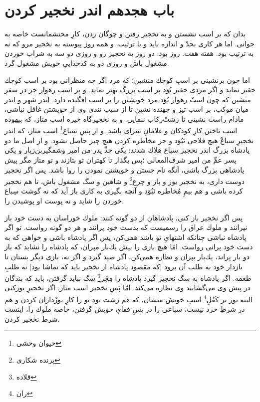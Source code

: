 \section*{باب هجدهم
اندر نخجير كردن}

بدان كه بر اسب نشستن و به نخجير رفتن و چوگان زدن، كارِ محتشمانست خاصه به جوانى. اما هر كارى بحدّ و اندازه بايد و با ترتيب. و همه روز پيوسته به نخجير مرو كه نه به ترتيب بود. هفته هفت. روز بود: دو روز به نخجير رو و روزى دو سه به شراب خوردن مشغول باش و روزى دو به كدخدايیِ خويش مشغول گرد.

اما چون برنشينى بر اسبِ كوچك منشين؛ كه مرد اگر چه منظرانى بود بر اسب كوچك حقير نمايد و اگر مردى حقير بُوَد بر اسب بزرگ بهتر نمايد. و بر اسب رهوار جز در سفر منشين كه چون اسبْ رهوار بُوَد مرد خويشتن را بر اسب افگنده دارد. اندر شهر و اندر ميان موكب، بر اسب تيز و جهنده نشين تا از سبب تندى وى از خويشتن غافل نباشى، مادام راست نشينى تا زشت‌ْركاب ننمايى. و به نخجيرگاه خيره‌ اسب متاز، كه بيهوده اسب تاختن كارِ كودكان و غلامان‌ِ سراى باشد. و از پسِ سباع\footnote{حیوان وحشی} اسب متاز، كه اندر نخجيرِ سباعْ هيچ فلاحى نَبُوَد و جز مخاطره كردن هيچ چيز حاصل نشود. و از اصل ما دو پادشاه بزرگ اندر نخجير سباع هلاك شدند: يكى جدِّ پدر من امير وشمگيربن‌زيار و يكى پسر عمِّ من امير شرف‌المعالى ؛پس بگذار تا كهتران تو بتازند و تو متاز مگر پيش پادشاهى بزرگ باشى، آنگه نام جستن و خويشتن نمودن را روا باشد. پس اگر نخجير دوست دارى، به نخجير يوز و باز و چرغ\footnote{پرنده‌ شکاری} و شاهين و سگ مشغول باش، تا هم نخجير كرده باشى و هم بيمِ مُخاطره نَبُوَد و آنچه بگيرى به كارى باز آيد كه نه گوشت سِباع خوردن را شايد و نه پوست او پوشيدن را.

پس اگر نخجير باز كنى،  پادشاهان از دو گونه كنند: ملوك خوراسان به دست خود باز نپرانند و ملوك عراق را رسميست كه بدست خود پرانند و هر دو گونه رواست. تو اگر پادشاه نباشى چنانكه اشتهاىِ تو باشد همى‌كن، پس اگر پادشاه باشى و خواهى كه به دست خود پرانى رواست. امّا هيچ بازى را بيش يك‌بار مپران، كه پادشاه را نشايد كه باز دو بار پراند، يك‌بار بپران و نظاره همى‌كن، اگر صيد گيرد و اگر نه، بازى ديگر بستان تا بازدار خود به طلب آن برود [كه مقصود پادشاه از نخجير بايد كه تماشا بود] نه طلبِ طعمه. اگر پادشاه به سگ نخجير گيرد پادشاه را مِجَر\footnote{قلاده} سگ نبايد گرفتن، بايد كه بندگان در پيش وى مى‌گشايند وى نظاره مى‌كند. امّا پَسِ نخجير اسب متاز. اگر نخجيرِ يوزكنى البته يوز بر کَفَلِ\footnote{ران} اسبِ خويش منشان، كه هم زشت بود تو را كارِ يوزْداران كردن و هم در شرطِ خرد نيست، سباعى را در پسِ قفاىِ خويش گرفتن، خاصه ملوك را، اينست شرط نخجير كردن.
























\newpage
